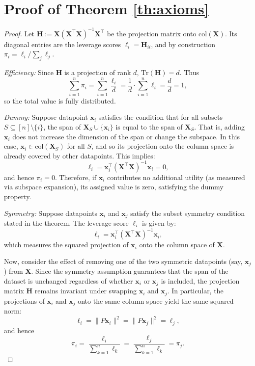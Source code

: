 \documentclass{article}
\def\hmat{\mathbf{H}}
\def\xmat{\mathbf{X}}
\def\x{\mathbf{x}}
\newcommand{\1}{\mathbbm{1}}
\begin{document}
\newpage
\appendix

\section{Proof of Theorem \ref{th:axioms}}
\label{app:proof-axioms}

\begin{proof}
Let $\hmat := \xmat(\xmat^\top \xmat)^{-1}\xmat^\top$ be the projection matrix onto $\mathrm{col}(\xmat)$. Its diagonal entries are the leverage scores $\ell_i=\hmat_{ii}$, and by construction $\pi_i=\ell_i/\sum_j \ell_j$.

{\em Efficiency:} Since $\hmat$ is a projection of rank $d$, $\mathrm{Tr}(\hmat)=d$. Thus
\[
\sum_{i=1}^n \pi_i = \sum_{i=1}^n \frac{\ell_i}{d} = \frac{1}{d} \cdot \sum_{i=1}^n \ell_i = \frac{d}{d} = 1,
\]
so the total value is fully distributed.

{\em Dummy:} Suppose datapoint $\x_i$ satisfies the condition that for all subsets \( S \subseteq [n] \setminus \{i\} \), the span of \( \xmat_S \cup \{\x_i\} \) is equal to the span of \( \xmat_S \). That is, adding \( \x_i \) does not increase the dimension of the span or change the subspace. In this case, \( \x_i \in \text{col}(\xmat_S) \) for all \( S \), and so its projection onto the column space is already covered by other datapoints. This implies:
\[
\ell_i = \x_i^\top (\xmat^\top \xmat)^{-1} \x_i = 0,
\]
and hence \( \pi_i = 0 \). Therefore, if \( \x_i \) contributes no additional utility (as measured via subspace expansion), its assigned value is zero, satisfying the dummy property.

{\em Symmetry:} Suppose datapoints $\x_i$ and $\x_j$ satisfy the subset symmetry condition stated in the theorem.
%
The leverage score $\ell_i$ is given by:
\[
\ell_i = \x_i^\top (\xmat^\top \xmat)^{-1} \x_i,
\]
which measures the squared projection of $\x_i$ onto the column space of $\xmat$.

Now, consider the effect of removing one of the two symmetric datapoints (say, $\x_j$) from $\xmat$. Since the symmetry assumption guarantees that the span of the dataset is unchanged regardless of whether $\x_i$ or $\x_j$ is included, the projection matrix $\hmat$ remains invariant under swapping $\x_i$ and $\x_j$.
%
In particular, the projections of $\x_i$ and $\x_j$ onto the same column space yield the same squared norm:
\[
\ell_i = \| P \x_i \|^2 = \| P \x_j \|^2 = \ell_j,
\]
and hence
\[
\pi_i = \frac{\ell_i}{\sum_{k=1}^n \ell_k} = \frac{\ell_j}{\sum_{k=1}^n \ell_k} = \pi_j.
\]
%
\end{proof}
\end{document}

